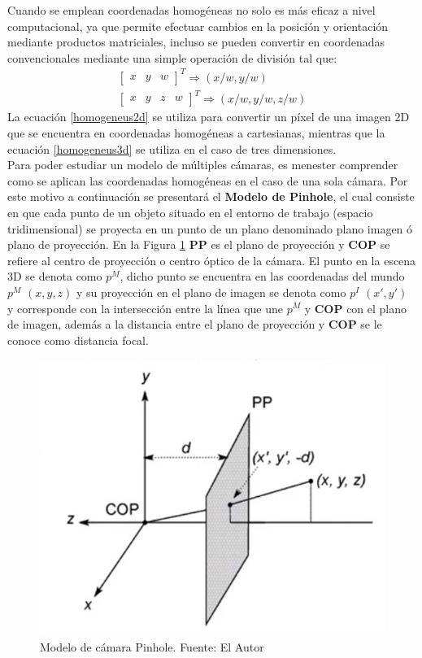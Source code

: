 Cuando se emplean coordenadas homogéneas no solo es más eficaz a nivel computacional, ya que permite efectuar cambios en la posición y orientación mediante productos matriciales, incluso se pueden convertir en coordenadas convencionales mediante una simple operación de división tal que:
\begin{align}
\begin{bmatrix}
x & y & w
\end{bmatrix}^{T} \Rightarrow (x/w, y/w)\label{homogeneus2d}\\
\begin{bmatrix}
x & y & z & w
\end{bmatrix}^{T} \Rightarrow (x/w, y/w, z/w)\label{homogeneus3d}
\end{align}
La ecuación \eqref{homogeneus2d} se utiliza para convertir un píxel de una imagen 2D que se encuentra en coordenadas homogéneas a cartesianas, mientras que la ecuación \eqref{homogeneus3d} se utiliza en el caso de tres dimensiones.
\\
Para poder estudiar un modelo de múltiples cámaras, es menester comprender como se aplican las coordenadas homogéneas en el caso de una sola cámara. Por este motivo a continuación se presentará el \textbf{Modelo de Pinhole}, el cual consiste en que cada punto de un objeto situado en el entorno de trabajo (espacio tridimensional) se proyecta en un punto de un plano denominado plano imagen ó plano de proyección. En la Figura \ref{pinholeModel} \textbf{PP} es el plano de proyección y \textbf{COP} se refiere al centro de proyección o centro óptico de la cámara. El punto en la escena 3D se denota como $p^{M}$, dicho punto se encuentra en las coordenadas del mundo $p^{M}$ $(x, y, z)$ y su proyección en el plano de imagen se denota como $p^{I}$ $(x', y')$ y corresponde con la intersección entre la línea que une $p^{M}$ y \textbf{COP} con el plano de imagen, además a la distancia entre el plano de proyección y \textbf{COP} se le conoce como distancia focal. 
\begin{figure}[H]
    \centering
    \includegraphics[scale=0.5]{Recursos/pinholeModel.jpg}
    \caption[Modelo de cámara Pinhole.]{Modelo de cámara Pinhole. {\footnotesize Fuente: El Autor}}
    \label{pinholeModel}
\end{figure}
